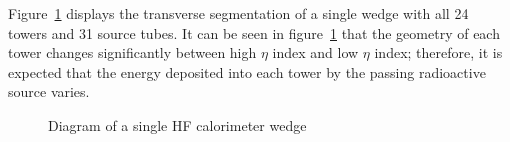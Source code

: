 Figure~\ref{fig:hf_description_wedgediagram} displays the transverse segmentation of a single wedge with all 24 towers and 31 source tubes. It can be seen in figure~\ref{fig:hf_description_wedgediagram} that the geometry of each tower changes significantly between high $\eta$ index and low $\eta$ index; therefore, it is expected that the energy deposited into each tower by the passing radioactive source varies.
\begin{figure}[H]
   \begin{center}
      \caption{Diagram of a single HF calorimeter wedge}
      \label{fig:hf_description_wedgediagram}
   \end{center}
\end{figure}

